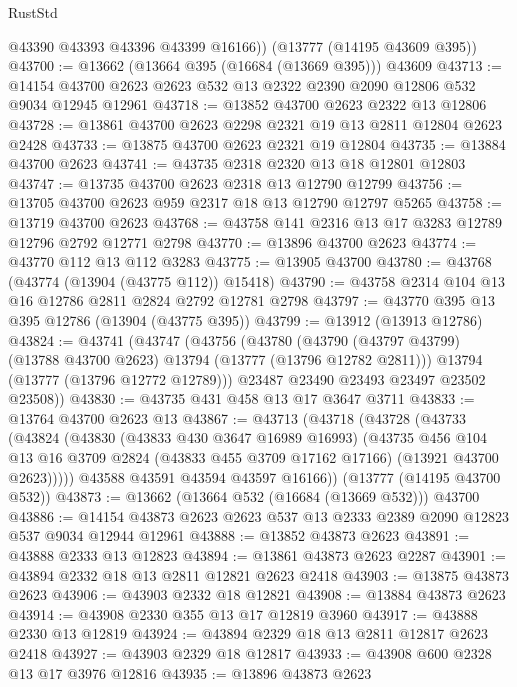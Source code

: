 \begin{lexlean}{RustStd}
\begin{coremodule}
        @43390
        @43393
        @43396
        @43399
        @16166))
    (@13777 (@14195 @43609 @395))
@43700 := @13662 (@13664 @395 (@16684 (@13669 @395))) @43609
@43713 := @14154 @43700 @2623 @2623 @532 @13 @2322 @2390 @2090 @12806 @532 @9034 @12945 @12961
@43718 := @13852 @43700 @2623 @2322 @13 @12806
@43728 := @13861 @43700 @2623 @2298 @2321 @19 @13 @2811 @12804 @2623 @2428
@43733 := @13875 @43700 @2623 @2321 @19 @12804
@43735 := @13884 @43700 @2623
@43741 := @43735 @2318 @2320 @13 @18 @12801 @12803
@43747 := @13735 @43700 @2623 @2318 @13 @12790 @12799
@43756 := @13705 @43700 @2623 @959 @2317 @18 @13 @12790 @12797 @5265
@43758 := @13719 @43700 @2623
@43768 := @43758 @141 @2316 @13 @17 @3283 @12789 @12796 @2792 @12771 @2798
@43770 := @13896 @43700 @2623
@43774 := @43770 @112 @13 @112 @3283
@43775 := @13905 @43700
@43780 := @43768 (@43774 (@13904 (@43775 @112)) @15418)
@43790 := @43758 @2314 @104 @13 @16 @12786 @2811 @2824 @2792 @12781 @2798
@43797 := @43770 @395 @13 @395 @12786 (@13904 (@43775 @395))
@43799 := @13912 (@13913 @12786)
@43824 := @43741
    (@43747
      (@43756
        (@43780
          (@43790 (@43797 @43799) (@13788 @43700 @2623) @13794 (@13777 (@13796 @12782 @2811)))
          @13794
          (@13777 (@13796 @12772 @12789)))
        @23487
        @23490
        @23493
        @23497
        @23502
        @23508))
@43830 := @43735 @431 @458 @13 @17 @3647 @3711
@43833 := @13764 @43700 @2623 @13
@43867 := @43713
    (@43718
      (@43728
        (@43733
          (@43824
            (@43830
              (@43833 @430 @3647 @16989 @16993)
              (@43735
                @456
                @104
                @13
                @16
                @3709
                @2824
                (@43833 @455 @3709 @17162 @17166)
                (@13921 @43700 @2623)))))
        @43588
        @43591
        @43594
        @43597
        @16166))
    (@13777 (@14195 @43700 @532))
@43873 := @13662 (@13664 @532 (@16684 (@13669 @532))) @43700
@43886 := @14154 @43873 @2623 @2623 @537 @13 @2333 @2389 @2090 @12823 @537 @9034 @12944 @12961
@43888 := @13852 @43873 @2623
@43891 := @43888 @2333 @13 @12823
@43894 := @13861 @43873 @2623 @2287
@43901 := @43894 @2332 @18 @13 @2811 @12821 @2623 @2418
@43903 := @13875 @43873 @2623
@43906 := @43903 @2332 @18 @12821
@43908 := @13884 @43873 @2623
@43914 := @43908 @2330 @355 @13 @17 @12819 @3960
@43917 := @43888 @2330 @13 @12819
@43924 := @43894 @2329 @18 @13 @2811 @12817 @2623 @2418
@43927 := @43903 @2329 @18 @12817
@43933 := @43908 @600 @2328 @13 @17 @3976 @12816
@43935 := @13896 @43873 @2623

\end{coremodule}
\end{lexlean}
